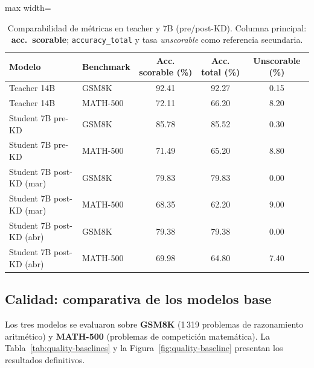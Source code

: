\documentclass[11pt,a4paper]{article}
\begin{document}
\begin{table}[H]
\centering
\caption{Comparabilidad de m\'etricas en teacher y 7B (pre/post-KD).
         Columna principal: \textbf{acc.\ scorable}; \texttt{accuracy\_total}
         y tasa \emph{unscorable} como referencia secundaria.}
\label{tab:teacher-7b-metrics}
\begin{adjustbox}{max width=\textwidth}
\begin{tabular}{llccc}
\toprule
\textbf{Modelo} & \textbf{Benchmark} & \textbf{Acc. scorable (\%)} & \textbf{Acc. total (\%)} & \textbf{Unscorable (\%)} \\
\midrule
Teacher 14B         & GSM8K    & 92.41 & 92.27 & 0.15 \\
Teacher 14B         & MATH-500 & 72.11 & 66.20 & 8.20 \\
\midrule
Student 7B pre-KD   & GSM8K    & 85.78 & 85.52 & 0.30 \\
Student 7B pre-KD   & MATH-500 & 71.49 & 65.20 & 8.80 \\
\midrule
Student 7B post-KD (mar) & GSM8K    & 79.83 & 79.83 & 0.00 \\
Student 7B post-KD (mar) & MATH-500 & 68.35 & 62.20 & 9.00 \\
Student 7B post-KD (abr) & GSM8K    & 79.38 & 79.38 & 0.00 \\
Student 7B post-KD (abr) & MATH-500 & 69.98 & 64.80 & 7.40 \\
\bottomrule
\end{tabular}
\end{adjustbox}
\end{table}

\subsection{Calidad: comparativa de los modelos base}

Los tres modelos se evaluaron sobre \textbf{GSM8K} (1\,319 problemas de
razonamiento aritm\'etico) y \textbf{MATH-500} (problemas de competici\'on
matem\'atica). La Tabla~\ref{tab:quality-baselines} y la
Figura~\ref{fig:quality-baseline} presentan los resultados definitivos.
\end{document}
